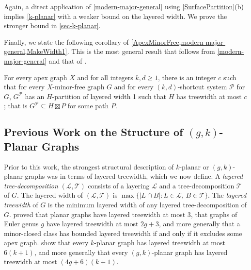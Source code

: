 \documentclass{patmorin}
\newcommand{\PP}{\mathcal{P}}
\renewcommand{\geq}{\geqslant}
\begin{document}
Again, a direct application of \cref{modern-major-general} using \cref{SurfacePartition}(b) implies \cref{k-planar} with a weaker bound on the layered width. We prove the stronger bound in \cref{sec-k-planar}. 

Finally, we state the following corollary of \cref{ApexMinorFree,modern-major-general,MakeWidth1}. This is the most general result that follows from \cref{modern-major-general} and that of \citet{dujmovic.joret.ea:planar}. 

\begin{thm}
For every apex graph $X$ and for all integers $k,d\geq 1$, there is an integer $c$ such that for every $X$-minor-free graph $G$ and for every $(k,d)$-shortcut system $\PP$ for $G$,  $G^\PP$ has an $H$-partition of layered width 1 such that $H$ has treewidth at most $c$; that is $G^\PP \subseteq H \boxtimes P$ for some path $P$. 
\end{thm}

\subsection{Previous Work on the Structure of $(g,k)$-Planar Graphs}
\label{PriorWork}


Prior to this work, the strongest structural description of $k$-planar or $(g,k)$-planar graphs was in terms of layered treewidth, which we now define.  A \emph{layered tree-decomposition} $(\mathcal{L},\mathcal{T})$ consists of a layering $\mathcal{L}$ and a tree-decomposition $\mathcal{T}$ of $G$. The layered width of $(\mathcal{L},\mathcal{T})$ is $\max\{|L\cap B|: L\in \mathcal{L},\, B\in \mathcal{T}\}$.  The \emph{layered treewidth} of $G$ is the minimum layered width of any layered tree-decomposition of $G$. \citet{dujmovic.morin.ea:layered} proved that planar graphs have layered treewidth at most 3, that graphs of Euler genus $g$ have layered treewidth at most $2g+3$, and more generally that a minor-closed class has bounded layered treewidth if and only if it excludes some apex graph. \citet{dujmovic.eppstein.ea:structure} show that every $k$-planar graph has layered treewidth at most $6(k+1)$, and more generally that 
every $(g,k)$-planar graph has layered treewidth at most $(4g+6)(k+1)$.
\end{document}
